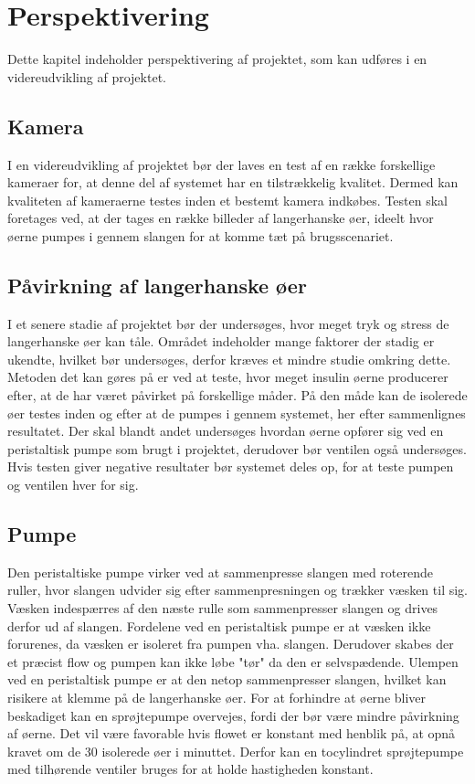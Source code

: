 \chapter{Perspektivering}
Dette kapitel indeholder perspektivering af projektet, som kan udføres i en videreudvikling af projektet.
\section{Kamera}
 I en videreudvikling af projektet bør der laves en test af en række forskellige kameraer for, at denne del af systemet har en tilstrækkelig kvalitet. Dermed kan kvaliteten af kameraerne testes inden et bestemt kamera indkøbes. Testen skal foretages ved, at der tages en række billeder af langerhanske øer, ideelt hvor øerne pumpes i gennem slangen for at komme tæt på brugsscenariet. 

\section{Påvirkning af langerhanske øer}
I et senere stadie af projektet bør der undersøges, hvor meget tryk og stress de langerhanske øer kan tåle. Området indeholder mange faktorer der stadig er ukendte, hvilket bør undersøges, derfor kræves et mindre studie omkring dette. Metoden det kan gøres på er ved at teste, hvor meget insulin øerne producerer efter, at de har været påvirket på forskellige måder. På den måde kan de isolerede øer testes inden og efter at de pumpes i gennem systemet, her efter sammenlignes resultatet. Der skal blandt andet undersøges hvordan øerne opfører sig ved en peristaltisk pumpe som brugt i projektet, derudover bør ventilen også undersøges. Hvis testen giver negative resultater bør systemet deles op, for at teste pumpen og ventilen hver for sig.

\section{Pumpe}
Den peristaltiske pumpe virker ved at sammenpresse slangen med roterende ruller, hvor slangen udvider sig efter sammenpresningen og trækker væsken til sig. Væsken indespærres af den næste rulle som sammenpresser slangen og drives derfor ud af slangen. Fordelene ved en peristaltisk pumpe er at væsken ikke forurenes, da væsken er isoleret fra pumpen vha. slangen. Derudover skabes der et præcist flow og pumpen kan ikke løbe "tør"  da den er selvspædende. Ulempen ved en peristaltisk pumpe er at den netop sammenpresser slangen, hvilket kan risikere at klemme på de langerhanske øer. For at forhindre at øerne bliver beskadiget kan en sprøjtepumpe overvejes, fordi der bør være mindre påvirkning af øerne. Det vil være favorable hvis flowet er konstant med henblik på, at opnå kravet om de 30 isolerede øer i minuttet. Derfor kan en tocylindret sprøjtepumpe med tilhørende ventiler bruges for at holde hastigheden konstant. 


